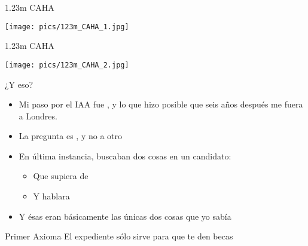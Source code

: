 \documentclass[14pt]{beamer}
\newcommand{\WebLink}[2]{
  \href{#1}{\structure{\PointingHand~\color{sail-green}{#2}}}
}
\begin{document}
\begin{frame}{1.23m CAHA}
  \begin{center}
    \texttt{[image: pics/123m\_CAHA\_1.jpg]}
  \end{center}
\end{frame}

\begin{frame}{1.23m CAHA}
  \begin{center}
    \texttt{[image: pics/123m\_CAHA\_2.jpg]}
  \end{center}
\end{frame}


\begin{frame}{¿Y eso?}
\begin{itemize}
  \item Mi paso por el IAA fue , y lo que hizo posible que seis
    años después me fuera a Londres.
  \item La pregunta es , y no a otro
  \item En última instancia, buscaban dos cosas en un candidato:
     \begin{itemize}
       \item Que supiera de 
       \item Y hablara 
     \end{itemize}
  \item Y ésas eran básicamente las únicas dos cosas que yo sabía
\end{itemize}
  \begin{alertblock}{\centering Primer Axioma}
    \centering El expediente sólo sirve para que te den becas
  \end{alertblock}
\end{frame}

\end{document}
